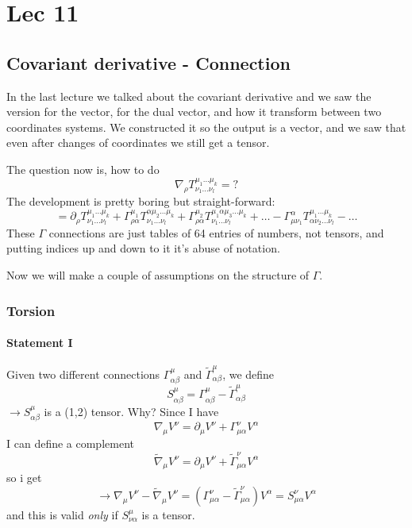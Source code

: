 \section{Lec 11}
\subsection{Covariant derivative - Connection}
In the last lecture we talked about the covariant derivative and we saw the version for the vector, for the dual vector, and how it transform between two coordinates systems. We constructed it so the output is a vector, and we saw that even after changes of coordinates we still get a tensor.\par
The question now is, how to do
\[
\nabla _{\rho }T^{\mu _{1}\ldots \mu _{k}}_{\nu _{1}\ldots \nu _{l}} = ?
\]
The development is pretty boring but straight-forward:
\begin{equation}
= \partial_{\rho }T^{\mu_{1} \ldots \mu_{k}}_{\nu_{1} \ldots \nu_{l}} + \Gamma ^{\mu _{1}}_{\rho \alpha } T^{\alpha \mu_{2} \ldots \mu_{k}}_{\nu_{1} \ldots \nu_{l}} + \Gamma ^{\mu_{2}}_{\rho \alpha }T^{\mu_{1} \alpha \mu_{3} \ldots \mu_{k}}_{\nu_{1} \ldots \nu_{l}} + \ldots - \Gamma ^{\alpha }_{\mu \nu _{1}} T^{\mu _{1} \ldots \mu _{k}}_{\alpha \nu_{2} \ldots \nu_{l}} - \ldots 
\end{equation}
These $\Gamma $ connections are just tables of 64 entries of numbers, not tensors, and putting indices up and down to it it's abuse of notation. \par
Now we will make a couple of assumptions on the structure of $\Gamma $.
\subsubsection{Torsion}
\paragraph{Statement I} Given two different connections $\Gamma^{\mu }_{\alpha \beta }$ and $\tilde{\Gamma }^{\mu }_{\alpha \beta }$, we define
\[
S^{\mu }_{\alpha \beta } = \Gamma ^{\mu }_{\alpha \beta } - \tilde{\Gamma }^{\mu }_{\alpha \beta }	
\]
$\to  S^{\mu }_{\alpha \beta }$ is a (1,2) tensor. Why? Since I have
\[
\nabla _{\mu }V^{\nu } = \partial_{\mu }V^{\nu }+ \Gamma ^{\nu }_{\mu  \alpha }V^{\alpha }
\]
I can define a complement
\[
\tilde{\nabla }_{\mu }V^{\nu } = \partial_{\mu }V^{\nu } + \tilde{\Gamma }^{\nu }_{\mu \alpha }V^{\alpha }
\]
so i get
\[
\to  \nabla _{\mu }V^{\nu }- \tilde{\nabla }_{\mu }V^{\nu } = \left( \Gamma ^{\nu }_{\mu  \alpha } - \tilde{\Gamma }^{\nu }_{\mu  \alpha } \right)V^{\alpha } = S^{\nu }_{\mu  \alpha }V^{\alpha }
\]
and this is valid \emph{only} if $S^{\mu }_{\nu  \alpha }$ is a tensor.

